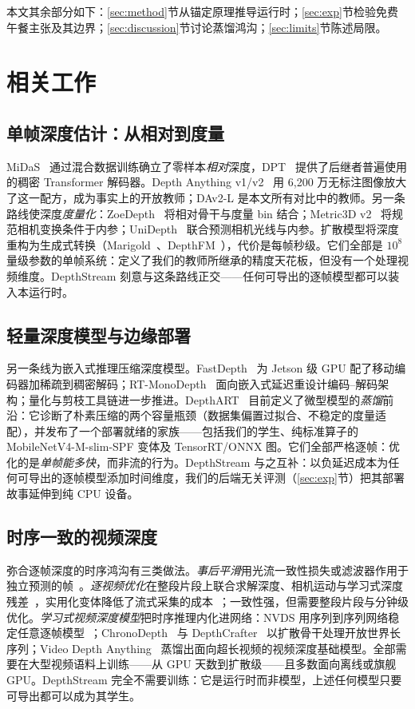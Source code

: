 \documentclass[10pt,twocolumn]{article}
\begin{document}
本文其余部分如下：\ref{sec:method}节从锚定原理推导运行时；\ref{sec:exp}节检验免费午餐主张及其边界；\ref{sec:discussion}节讨论蒸馏鸿沟；\ref{sec:limits}节陈述局限。

\section{相关工作}
\label{sec:related}

\subsection{单帧深度估计：从相对到度量}
MiDaS~\cite{midas} 通过混合数据训练确立了零样本\emph{相对}深度，DPT~\cite{dpt} 提供了后继者普遍使用的稠密 Transformer 解码器。Depth Anything v1/v2~\cite{da1,dav2} 用 6,200 万无标注图像放大了这一配方，成为事实上的开放教师；DAv2-L 是本文所有对比中的教师。另一条路线使深度\emph{度量化}：ZoeDepth~\cite{zoedepth} 将相对骨干与度量 bin 结合；Metric3D v2~\cite{metric3d} 将规范相机变换条件于内参；UniDepth~\cite{unidepth} 联合预测相机光线与内参。扩散模型将深度重构为生成式转换（Marigold~\cite{marigold}、DepthFM~\cite{depthfm}），代价是每帧秒级。它们全部是 $10^8$ 量级参数的单帧系统：定义了我们的教师所继承的精度天花板，但没有一个处理视频维度。DepthStream 刻意与这条路线正交——任何可导出的逐帧模型都可以装入本运行时。

\subsection{轻量深度模型与边缘部署}
另一条线为嵌入式推理压缩深度模型。FastDepth~\cite{fastdepth} 为 Jetson 级 GPU 配了移动编码器加稀疏到稠密解码；RT-MonoDepth~\cite{rtmonodepth} 面向嵌入式延迟重设计编码--解码架构；量化与剪枝工具链进一步推进。DepthART~\cite{depthart} 目前定义了微型模型的\emph{蒸馏}前沿：它诊断了朴素压缩的两个容量瓶颈（数据集偏置过拟合、不稳定的度量适配），并发布了一个部署就绪的家族——包括我们的学生、纯标准算子的 MobileNetV4-M-slim-SPF 变体及 TensorRT/ONNX 图。它们全部严格逐帧：优化的是\emph{单帧能多快}，而非流的行为。DepthStream 与之互补：以负延迟成本为任何可导出的逐帧模型添加时间维度，我们的后端无关评测（\ref{sec:exp}节）把其部署故事延伸到纯 CPU 设备。

\subsection{时序一致的视频深度}
弥合逐帧深度的时序鸿沟有三类做法。\emph{事后平滑}用光流一致性损失或滤波器作用于独立预测的帧~\cite{teccvideodepth}。\emph{逐视频优化}在整段片段上联合求解深度、相机运动与学习式深度残差~\cite{cvd}，实用化变体降低了流式采集的成本~\cite{practicalcvd}；一致性强，但需要整段片段与分钟级优化。\emph{学习式视频深度模型}把时序推理内化进网络：NVDS 用序列到序列网络稳定任意逐帧模型~\cite{nvds}；ChronoDepth~\cite{chronodepth} 与 DepthCrafter~\cite{depthcrafter} 以扩散骨干处理开放世界长序列；Video Depth Anything~\cite{vda} 蒸馏出面向超长视频的视频深度基础模型。全部需要在大型视频语料上训练——从 GPU 天数到扩散级——且多数面向离线或旗舰 GPU。DepthStream 完全不需要训练：它是运行时而非模型，上述任何模型只要可导出都可以成为其学生。
\end{document}
